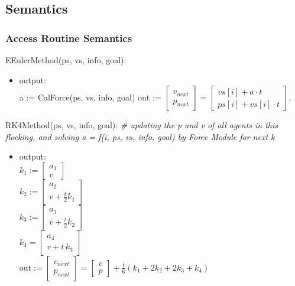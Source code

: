 \documentclass[12pt, titlepage]{article}
\begin{document}
\subsection{Semantics}

\subsubsection{Access Routine Semantics}

\noindent EEulerMethod(ps, vs, info, goal):
\begin{itemize}
\item output: \\
a := CalForce(ps, vs, info, goal)
out := $\begin{bmatrix} v_{next} \\ p_{next} \end{bmatrix} = \begin{bmatrix} vs[i] + a \cdot t \\ ps[i] + vs[i] \cdot t \end{bmatrix}$. 
\end{itemize}

\noindent RK4Method(ps, vs, info, goal):
\textit{\# updating the p and v of all agents in this flocking, and solving a = f(i, ps, vs, info, goal) by Force Module for next k}
\begin{itemize}
\item output: \\
$k_1 := \begin{bmatrix} a_1 \\ v \end{bmatrix}$ \\
$k_2 := \begin{bmatrix} a_2 \\ v + \frac{t}{2}k_{1} \end{bmatrix}$ \\
$k_3 := \begin{bmatrix} a_3 \\ v + \frac{t}{2}k_{2} \end{bmatrix}$ \\
$k_4 = \begin{bmatrix} a_4 \\ v + t\,k_{3} \end{bmatrix}$ \\
$\text{out} := \begin{bmatrix} v_{next} \\ p_{next} \end{bmatrix} = \begin{bmatrix} v \\ p \end{bmatrix} + \frac{t}{6}(k_1 + 2k_2 + 2k_3 + k_4)$
\end{itemize}
\end{document}
